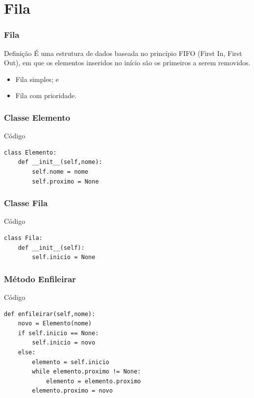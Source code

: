 \documentclass{beamer}
\begin{document}
\section{Fila}

\begin{frame}
\frametitle{Fila}

\begin{block}{Definição}
	 É uma estrutura de dados baseada no princípio FIFO (First In, First Out), em que os elementos inseridos no início são os primeiros a serem removidos. 
\end{block}\vfill

\begin{itemize}
	\item Fila simples; e
	\item Fila com prioridade.
\end{itemize}
\end{frame}

\begin{frame}[fragile]
\frametitle{Classe Elemento}

\begin{exampleblock}{Código}
	\begin{lstlisting}
class Elemento:
	def __init__(self,nome):
	    self.nome = nome
        self.proximo = None
	\end{lstlisting}
\end{exampleblock}
\end{frame}

\begin{frame}[fragile]
\frametitle{Classe Fila}

\begin{exampleblock}{Código}
	\begin{lstlisting}
class Fila:
    def __init__(self):
        self.inicio = None
	\end{lstlisting}
\end{exampleblock}
\end{frame}

\begin{frame}[fragile]
\frametitle{Método Enfileirar}

\begin{exampleblock}{Código}
	\begin{lstlisting}
def enfileirar(self,nome):
    novo = Elemento(nome)
    if self.inicio == None:
        self.inicio = novo
    else:
        elemento = self.inicio
        while elemento.proximo != None:
            elemento = elemento.proximo
        elemento.proximo = novo
	\end{lstlisting}
\end{exampleblock}
\end{frame}
\end{document}
